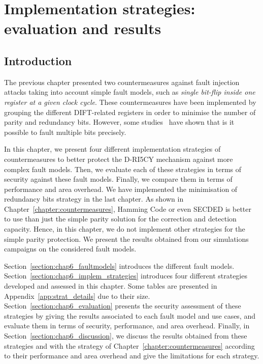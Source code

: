 \chapter{Implementation strategies: evaluation and results}
\label{chapter:exp_setup_results}
\minitoc

\section{Introduction}
The previous chapter presented two countermeasures against fault injection attacks taking into account simple fault models, such as \textit{single bit-flip inside one register at a given clock cycle}. These countermeasures have been implemented by grouping the different DIFT-related registers in order to minimise the number of parity and redundancy bits. However, some studies~\cite{CGVCBLC-22-cardis,VDSPB-24-jce} have shown that is it possible to fault multiple bits precisely.

In this chapter, we present four different implementation strategies of countermeasures to better protect the D-RI5CY mechanism against more complex fault models. Then, we evaluate each of these strategies in terms of security against these fault models. Finally, we compare them in terms of performance and area overhead. We have implemented the minimisation of redundancy bits strategy in the last chapter. As shown in Chapter~\ref{chapter:countermeasures}, Hamming Code or even SECDED is better to use than just the simple parity solution for the correction and detection capacity. Hence, in this chapter, we do not implement other strategies for the simple parity protection. We present the results obtained from our simulations campaigns on the considered fault models.

Section~\ref{section:chap6_faultmodels} introduces the different fault models.
Section~\ref{section:chap6_implem_strategies} introduces four different strategies developed and assessed in this chapter. Some tables are presented in Appendix~\ref{app:strat_details} due to their size.
Section~\ref{section:chap6_evaluation} presents the security assessment of these strategies by giving the results associated to each fault model and use cases, and evaluate them in terms of security, performance, and area overhead.
Finally, in Section~\ref{section:chap6_discussion}, we discuss the results obtained from these strategies and with the strategy of Chapter~\ref{chapter:countermeasures} according to their performance and area overhead and give the limitations for each strategy.

